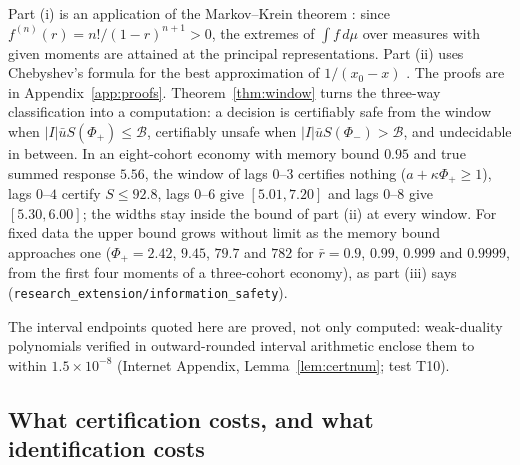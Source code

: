 \documentclass[12pt]{article}
\theoremstyle{definition}
\theoremstyle{remark}
\begin{document}
Part (i) is an application of the Markov--Krein theorem \citep{krein1977,karlin1966}: since $f^{(n)}(r)=n!/(1-r)^{n+1}>0$, the extremes of $\int f\,d\mu$ over measures with given moments are attained at the principal representations. Part (ii) uses Chebyshev's formula for the best approximation of $1/(x_0-x)$ \citep{achieser1956}. The proofs are in Appendix~\ref{app:proofs}. Theorem~\ref{thm:window} turns the three-way classification into a computation: a decision is certifiably safe from the window when $|I|\bar uS(\Phi_+)\le\mathcal B$, certifiably unsafe when $|I|\bar uS(\Phi_-)>\mathcal B$, and undecidable in between. In an eight-cohort economy with memory bound $0.95$ and true summed response $5.56$, the window of lags $0$--$3$ certifies nothing ($a+\kappa\Phi_+\ge1$), lags $0$--$4$ certify $S\le92.8$, lags $0$--$6$ give $[5.01,7.20]$ and lags $0$--$8$ give $[5.30,6.00]$; the widths stay inside the bound of part (ii) at every window. For fixed data the upper bound grows without limit as the memory bound approaches one ($\Phi_+=2.42$, $9.45$, $79.7$ and $782$ for $\bar r=0.9$, $0.99$, $0.999$ and $0.9999$, from the first four moments of a three-cohort economy), as part (iii) says (\texttt{research\_extension/information\_safety}).

The interval endpoints quoted here are proved, not only computed: weak-duality polynomials verified in outward-rounded interval arithmetic enclose them to within $1.5\times10^{-8}$ (Internet Appendix, Lemma~\ref{lem:certnum}; test T10).

\subsection{What certification costs, and what identification costs}
\end{document}
